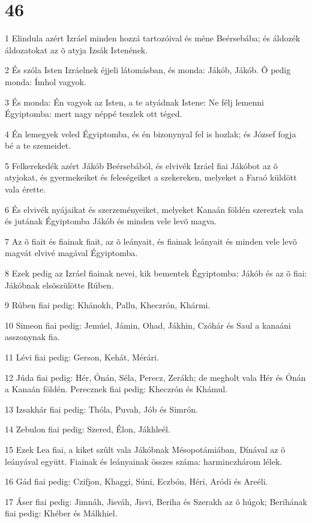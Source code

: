 \chapter{46}

\par 1 Elindula azért Izráel minden hozzá tartozóival és méne Beérsebába; és áldozék áldozatokat az õ atyja Izsák Istenének.
\par 2 És szóla Isten Izráelnek éjjeli látomásban, és monda: Jákób, Jákób. Õ pedig monda: Ímhol vagyok.
\par 3 És monda: Én vagyok az Isten, a te atyádnak Istene: Ne félj lemenni Égyiptomba: mert nagy néppé teszlek ott téged.
\par 4 Én lemegyek veled Égyiptomba, és én bizonynyal fel is hozlak; és József fogja bé a te szemeidet.
\par 5 Felkerekedék azért Jákób Beérsebából, és elvivék Izráel fiai Jákóbot az õ atyjokat, és gyermekeiket és feleségeiket a szekereken, melyeket a Faraó küldött vala érette.
\par 6 És elvivék nyájaikat és szerzeményeiket, melyeket Kanaán földén szereztek vala és jutának Égyiptomba Jákób és minden vele levõ magva.
\par 7 Az õ fiait és fiainak fiait, az õ leányait, és fiainak leányait és minden vele levõ magvát elvivé magával Égyiptomba.
\par 8 Ezek pedig az Izráel fiainak nevei, kik bementek Égyiptomba: Jákób és az õ fiai: Jákóbnak elsõszülötte Rúben.
\par 9 Rúben fiai pedig: Khánokh, Pallu, Kheczrón, Khármi.
\par 10 Simeon fiai pedig: Jemúel, Jámin, Ohad, Jákhin, Czóhár és Saul a kanaáni asszonynak fia.
\par 11 Lévi fiai pedig: Gerson, Kehát, Mérári.
\par 12 Júda fiai pedig: Hér, Ónán, Séla, Perecz, Zerákh; de megholt vala Hér és Ónán a Kanaán földén.  Perecznek fiai pedig: Kheczrón és Khámul.
\par 13 Izsakhár fiai pedig: Thóla, Puvah, Jób és Simrón.
\par 14 Zebulon fiai pedig: Szered, Élon, Jákhleél.
\par 15 Ezek Lea fiai, a kiket szûlt vala Jákóbnak Mésopotámiában, Dínával az õ leányával együtt. Fiainak és leányainak összes száma: harminczhárom lélek.
\par 16 Gád fiai pedig: Czifjon, Khaggi, Súni, Eczbón, Héri, Aródi és Areéli.
\par 17 Áser fiai pedig: Jimnáh, Jisváh, Jisvi, Beriha és Szerakh az õ húgok; Berihának fiai pedig: Khéber és Málkhiel.
